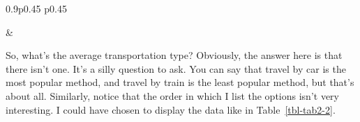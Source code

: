 \documentclass[
  letterpaper,
]{book}
\begin{document}
\begin{table}[ht]
\begin{centerbox}
\begin{threeparttable}
\begin{tabularx}{0.9\textwidth}{p{} p{}}
\hhline{}

 &
 \tabularnewline[-0.5pt]


\end{tabularx} 

\end{threeparttable}\par\end{centerbox}

\end{table}
 

So, what's the average transportation type? Obviously, the answer here
is that there isn't one. It's a silly question to ask. You can say that
travel by car is the most popular method, and travel by train is the
least popular method, but that's about all. Similarly, notice that the
order in which I list the options isn't very interesting. I could have
chosen to display the data like in Table~\ref{tbl-tab2-2}.

\hypertarget{tbl-tab2-2}{}
 
  \providecommand{\huxb}[2]{\arrayrulecolor[RGB]{#1}\global\arrayrulewidth=#2pt}
  \providecommand{\huxvb}[2]{\color[RGB]{#1}\vrule width #2pt}
  \providecommand{\huxtpad}[1]{\rule{0pt}{#1}}
  \providecommand{\huxbpad}[1]{\rule[-#1]{0pt}{#1}}
\end{document}
